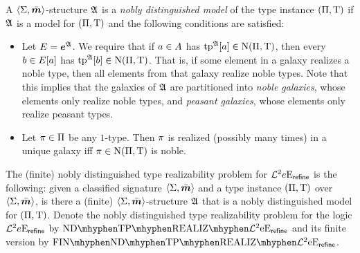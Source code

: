 \begin{definition}
A $\left\langle \mathrm{\Sigma},\bar{\bm{m}} \right\rangle$-structure $\mathfrak{A}$ is a \emph{nobly distinguished model} of
the type instance $(\Pi,\mathrm{T})$ if $\mathfrak{A}$ is a model for $(\Pi,\mathrm{T})$
and the following conditions are satisfied:
\begin{itemize}
  \item[\condrealizd]\label{cond:realizd}
  Let $E = \bm{e}^{\mathfrak{A}}$. We require that if $a \in
  A$ has $\operatorname{tp}^{\mathfrak{A}}[a] \in \mathrm{\mathrm{N}}(\Pi,\mathrm{T})$, then every $b \in E[a]$
  has $\operatorname{tp}^{\mathfrak{A}}[b] \in \mathrm{\mathrm{N}}(\Pi,\mathrm{T})$. That is, if some element in a galaxy
  realizes a noble type, then all elements from that galaxy realize noble types.
  Note that this implies that the galaxies of $\mathfrak{A}$ are partitioned into
  \emph{noble galaxies}, whose elements only realize noble types, and
  \emph{peasant galaxies}, whose elements only realize peasant types.
  \item[\condrealizn]\label{cond:realizn}
  Let $\pi \in \Pi$ be any $1$-type. Then $\pi$ is realized
  (possibly many times) in a unique galaxy iff $\pi \in \mathrm{\mathrm{N}}(\Pi,\mathrm{T})$ is
  noble.
\end{itemize}
\end{definition}

\begin{definition}
The (finite) nobly distinguished type realizability problem for
$\mathcal{L}^{2}{e}\mathrm{E}_{\mathsf{refine}}$ is the following: given a classified signature
$\left\langle \mathrm{\Sigma},\bar{\bm{m}} \right\rangle$ and a type instance $(\Pi,\mathrm{T})$ over $\left\langle \mathrm{\Sigma},\bar{\bm{m}} \right\rangle$,
is there a (finite) $\left\langle \mathrm{\Sigma},\bar{\bm{m}} \right\rangle$-structure $\mathfrak{A}$ that is a nobly
distinguished model for $(\Pi,\mathrm{T})$. Denote the nobly distinguished type
realizability problem for the logic $\mathcal{L}^{2}{e}\mathrm{E}_{\mathsf{refine}}$ by
$\NDReal{\vFo2\Eea\sze\agrefine}$ and its finite version by
$\FinNDReal{\vFo2\Eea\sze\agrefine}$.
\end{definition}

